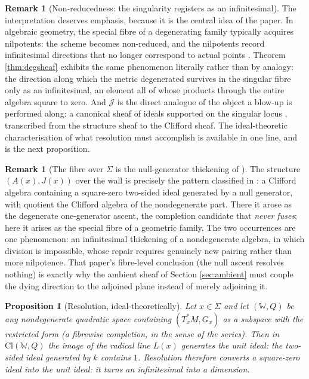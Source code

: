\documentclass[11pt]{article}
\newtheorem{proposition}[theorem]{Proposition}
\theoremstyle{definition}
\newtheorem{remark}[theorem]{Remark}
\newcommand{\Cl}{\mathrm{Cl}}
\newcommand{\shJ}{\mathcal{J}}
\newcommand{\shL}{L}
\newcommand{\Sig}{\Sigma}
\begin{document}
\begin{remark}[Non-reducedness: the singularity registers as an infinitesimal]\label{rem:nonreduced}
The interpretation deserves emphasis, because it is the central idea of the paper. In algebraic geometry, the special fibre of a degenerating family typically acquires nilpotents: the scheme becomes non-reduced, and the nilpotents record infinitesimal directions that no longer correspond to actual points \cite[Ch.~II]{Hartshorne1977}. Theorem \ref{thm:degsheaf} exhibits the same phenomenon literally rather than by analogy: the direction along which the metric degenerated survives in the singular fibre only as an infinitesimal, an element all of whose products through the entire algebra square to zero. And $\shJ$ is the direct analogue of the object a blow-up is performed along: a canonical sheaf of ideals supported on the singular locus \cite[\S II.7]{Hartshorne1977}, transcribed from the structure sheaf to the Clifford sheaf. The ideal-theoretic characterisation of what resolution must accomplish is available in one line, and is the next proposition.
\end{remark}

\begin{remark}[The fibre over $\Sig$ is the null-generator thickening of \cite{ButlerT1}]\label{rem:T2germ}
The structure $(A(x), J(x))$ over the wall is precisely the pattern classified in \cite[Thm.~5.7(2)]{ButlerT1}: a Clifford algebra containing a square-zero two-sided ideal generated by a null generator, with quotient the Clifford algebra of the nondegenerate part. There it arose as the degenerate one-generator ascent, the completion candidate that \emph{never fuses}; here it arises as the special fibre of a geometric family. The two occurrences are one phenomenon: an infinitesimal thickening of a nondegenerate algebra, in which division is impossible, whose repair requires genuinely new pairing rather than more nilpotence. That paper's fibre-level conclusion (the null ascent resolves nothing) is exactly why the ambient sheaf of Section \ref{sec:ambient} must couple the dying direction to the adjoined plane instead of merely adjoining it.
\end{remark}

\begin{proposition}[Resolution, ideal-theoretically]\label{prop:resolution}
Let $x \in \Sig$ and let $(\mathbb{W}, Q)$ be any nondegenerate quadratic space containing $(T^*_xM, G_x)$ as a subspace with the restricted form (a fibrewise completion, in the sense of the series). Then in $\Cl(\mathbb{W}, Q)$ the image of the radical line $\shL(x)$ generates the \emph{unit} ideal: the two-sided ideal generated by $k$ contains $1$. Resolution therefore converts a square-zero ideal into the unit ideal: it turns an infinitesimal into a dimension.
\end{proposition}
\end{document}
